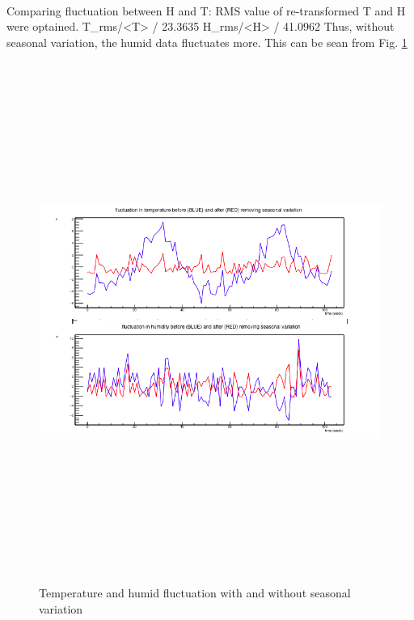 \paragraph{}
Comparing fluctuation between H and T: RMS value of re-transformed T and H were optained.
\beq
T_{rms}/<T> / 23.3635 
\eeq
\beq
H_{rms}/<H> / 41.0962 
\eeq 
Thus, without seasonal variation, the humid data fluctuates more. This can be sean from Fig. \ref{sea}



\begin{figure}[!htbp]
 
\begin{center}
\includegraphics[height=17cm, width=17cm]{1_c_final.png}
\caption{Temperature and humid fluctuation with and without seasonal variation}
\label{sea}
\end{center}
\end{figure}


\FloatBarrier



